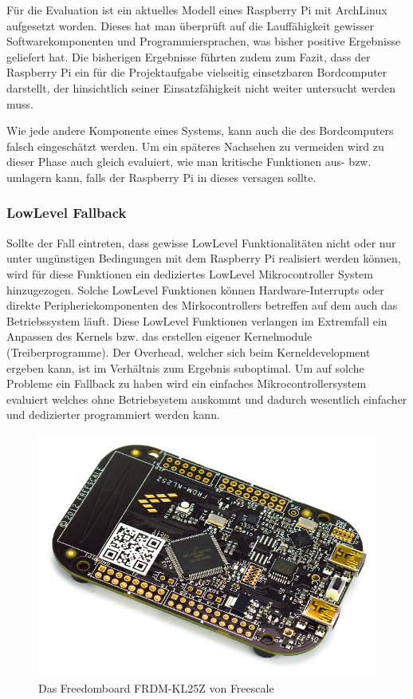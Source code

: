 Für die Evaluation ist ein aktuelles Modell eines Raspberry Pi mit
ArchLinux aufgesetzt worden. Dieses hat man überprüft auf die 
Lauffähigkeit gewisser Softwarekomponenten und Programmiersprachen,
was bisher positive Ergebnisse geliefert hat. Die bisherigen Ergebnisse
führten zudem zum Fazit, dass der Raspberry Pi ein für die Projektaufgabe
vielseitig einsetzbaren Bordcomputer darstellt, der hinsichtlich seiner
Einsatzfähigkeit nicht weiter untersucht werden muss.

Wie jede andere Komponente eines Systems, kann auch die des Bordcomputers
falsch eingeschätzt werden. Um ein späteres Nachsehen zu vermeiden wird
zu dieser Phase auch gleich evaluiert, wie man kritische Funktionen
aus- bzw. umlagern kann, falls der Raspberry Pi in dieses versagen sollte.

\subsubsection{LowLevel Fallback}
Sollte der Fall eintreten, dass gewisse LowLevel Funktionalitäten nicht
oder nur unter ungünstigen Bedingungen mit dem Raspberry Pi realisiert 
werden können, wird für diese Funktionen ein dediziertes LowLevel 
Mikrocontroller System hinzugezogen. Solche LowLevel Funktionen können
Hardware-Interrupts oder direkte Peripheriekomponenten des Mirkocontrollers
betreffen auf dem auch das Betriebssystem läuft. Diese LowLevel Funktionen
verlangen im Extremfall ein Anpassen des Kernels bzw. das erstellen eigener
Kernelmodule (Treiberprogramme). Der Overhead, welcher sich beim 
Kerneldevelopment ergeben kann, ist im Verhältnis zum Ergebnis suboptimal. 
Um auf solche Probleme ein Fallback zu haben wird ein einfaches 
Mikrocontrollersystem evaluiert welches ohne Betriebsystem auskommt und
dadurch wesentlich einfacher und dedizierter programmiert werden kann.

\begin{figure}[h!]
	\centering
	\includegraphics[scale=1]{../../fig/frdm-kl25z.jpg}
	\caption{Das Freedomboard FRDM-KL25Z von Freescale}
\end{figure}

